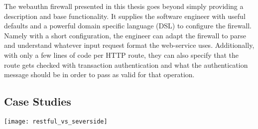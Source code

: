 The webauthn firewall presented in this thesis goes beyond simply providing a description and base functionality. It supplies the software engineer with useful defaults and a powerful domain specific language (DSL) to configure the firewall. Namely with a short configuration, the engineer can adapt the firewall to parse and understand whatever input request format the web-service uses. Additionally, with only a few lines of code per HTTP route, they can also specify that the route gets checked with transaction authentication and what the authentication message should be in order to pass as valid for that operation. 




\subsection{Case Studies}

\begin{center}
\texttt{[image: restful\_vs\_severside]}
\end{center}


